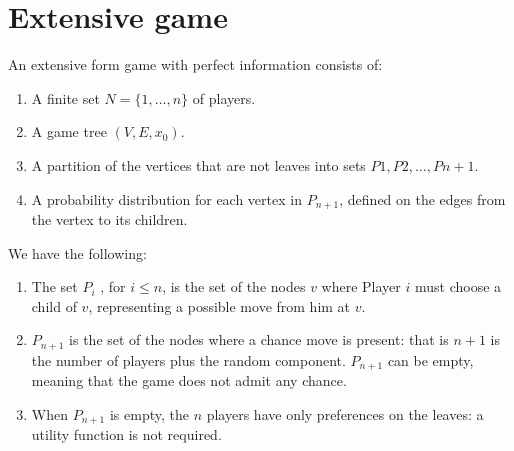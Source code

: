 \section{Extensive game}

\begin{definition}
    An extensive form game with perfect information consists of: 
    \begin{enumerate}
        \item A finite set $N = \{1,\dots,n\}$ of players. 
        \item A game tree $(V,E,x_0)$.
        \item A partition of the vertices that are not leaves into sets ${P1, P2, \dots , Pn+1}$.
        \item A probability distribution for each vertex in $P_{n+1}$, defined on the edges from the vertex to its children.   
    \end{enumerate}
\end{definition}
We have the following: 
\begin{enumerate}
    \item The set $P_i$ , for $i \leq n$, is the set of the nodes $v$ where Player $i$ must choose a child of $v$, representing a possible move from him at $v$.
    \item $P_{n+1}$ is the set of the nodes where a chance move is present: that is $n + 1$ is the number of players plus the random component. 
        $P_{n+1}$ can be empty, meaning that the game does not admit any chance.
    \item When $P_{n+1}$ is empty, the $n$ players have only preferences on the leaves: a utility function is not required. 
\end{enumerate}

